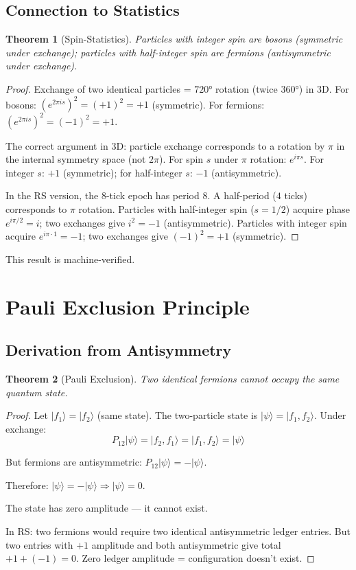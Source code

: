 \documentclass[12pt,a4paper]{article}
\newtheorem{theorem}{Theorem}[section]
\theoremstyle{definition}
\theoremstyle{remark}
\begin{document}
\subsection{Connection to Statistics}

\begin{theorem}[Spin-Statistics]
Particles with integer spin are bosons 
(symmetric under exchange); particles with half-integer spin are fermions 
(antisymmetric under exchange).
\end{theorem}

\begin{proof}
Exchange of two identical particles = $720°$ rotation (twice $360°$) in 3D.
For bosons: $(e^{2\pi i s})^2 = (+1)^2 = +1$ (symmetric).
For fermions: $(e^{2\pi i s})^2 = (-1)^2 = +1$.

The correct argument in 3D: particle exchange corresponds to a rotation by $\pi$ 
in the internal symmetry space (not $2\pi$). For spin $s$ under $\pi$ rotation:
$e^{i\pi s}$. For integer $s$: $+1$ (symmetric); for half-integer $s$: $-1$ 
(antisymmetric).

In the RS version, the 8-tick epoch has period 8. A half-period ($4$ ticks) 
corresponds to $\pi$ rotation. Particles with half-integer spin ($s = 1/2$) 
acquire phase $e^{i\pi/2} = i$; two exchanges give $i^2 = -1$ (antisymmetric).
Particles with integer spin acquire $e^{i\pi \cdot 1} = -1$; two exchanges give 
$(-1)^2 = +1$ (symmetric).
\end{proof}

This result is machine-verified.

\section{Pauli Exclusion Principle}

\subsection{Derivation from Antisymmetry}

\begin{theorem}[Pauli Exclusion]
Two identical fermions cannot occupy the same quantum state.
\end{theorem}

\begin{proof}
Let $|f_1\rangle = |f_2\rangle$ (same state). The two-particle 
state is $|\psi\rangle = |f_1, f_2\rangle$. Under exchange:
\begin{equation}
P_{12}|\psi\rangle = |f_2, f_1\rangle = |f_1, f_2\rangle = |\psi\rangle
\end{equation}

But fermions are antisymmetric: $P_{12}|\psi\rangle = -|\psi\rangle$.

Therefore: $|\psi\rangle = -|\psi\rangle \Rightarrow |\psi\rangle = 0$.

The state has zero amplitude --- it cannot exist.

In RS: two fermions would require two identical antisymmetric ledger entries. 
But two entries with $+1$ amplitude and both antisymmetric give total $+1 + (-1) = 0$.
Zero ledger amplitude = configuration doesn't exist.
\end{proof}
\end{document}
